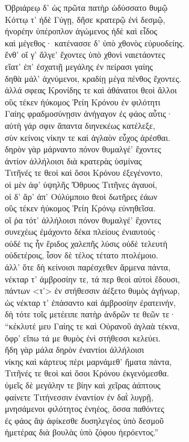 \begin{pages}
\begin{Leftside}
{\minion\Para}
Ὀβριάρεῳ δ' ὡς πρῶτα πατὴρ ὠδύσσατο θυμῷ \\
Κόττῳ τ' ἠδὲ Γύγῃ, δῆσε κρατερῷ ἐνὶ δεσμῷ, \\
ἠνορέην ὑπέροπλον ἀγώμενος ἠδὲ καὶ εἶδος\\
καὶ μέγεθος· κατένασσε δ' ὑπὸ χθονὸς εὐρυοδείης.  \\
ἔνθ' οἵ γ' ἄλγε' ἔχοντες ὑπὸ χθονὶ ναιετάοντες\\
εἵατ' ἐπ' ἐσχατιῇ μεγάλης ἐν πείρασι γαίης \\
δηθὰ μάλ' ἀχνύμενοι, κραδίῃ μέγα πένθος ἔχοντες.\\
ἀλλά σφεας Κρονίδης τε καὶ ἀθάνατοι θεοὶ ἄλλοι \\
οὓς τέκεν ἠύκομος Ῥείη Κρόνου ἐν φιλότητι  \\
Γαίης φραδμοσύνῃσιν ἀνήγαγον ἐς φάος αὖτις· \\
αὐτὴ γάρ σφιν ἅπαντα διηνεκέως κατέλεξε, \\
σὺν κείνοις νίκην τε καὶ ἀγλαὸν εὖχος ἀρέσθαι.\\
δηρὸν γὰρ μάρναντο πόνον θυμαλγέ' ἔχοντες\\
ἀντίον ἀλλήλοισι διὰ κρατερὰς ὑσμίνας   \\
Τιτῆνές τε θεοὶ καὶ ὅσοι Κρόνου ἐξεγένοντο, \\
οἱ μὲν ἀφ' ὑψηλῆς Ὄθρυος Τιτῆνες ἀγαυοί,  \\
οἱ δ' ἄρ' ἀπ' Οὐλύμποιο θεοὶ δωτῆρες ἐάων \\
οὓς τέκεν ἠύκομος Ῥείη Κρόνῳ εὐνηθεῖσα.\\
οἵ ῥα τότ' ἀλλήλοισι πόνον θυμαλγέ' ἔχοντες  \\
συνεχέως ἐμάχοντο δέκα πλείους ἐνιαυτούς· \\
οὐδέ τις ἦν ἔριδος χαλεπῆς λύσις οὐδὲ τελευτὴ\\
οὐδετέροις, ἶσον δὲ τέλος τέτατο πτολέμοιο.\\

\quad{}ἀλλ' ὅτε δὴ κείνοισι παρέσχεθεν ἄρμενα πάντα,\\
νέκταρ τ' ἀμβροσίην τε, τά περ θεοὶ αὐτοὶ ἔδουσι, \\
πάντων \textless{}τ'\textgreater{} ἐν στήθεσσιν ἀέξετο θυμὸς ἀγήνωρ,\\
ὡς νέκταρ τ' ἐπάσαντο καὶ ἀμβροσίην ἐρατεινήν,\\
δὴ τότε τοῖς μετέειπε πατὴρ ἀνδρῶν τε θεῶν τε·\\
``κέκλυτέ μευ Γαίης τε καὶ Οὐρανοῦ ἀγλαὰ τέκνα, \\
ὄφρ' εἴπω τά με θυμὸς ἐνὶ στήθεσσι κελεύει.  \\
ἤδη γὰρ μάλα δηρὸν ἐναντίοι ἀλλήλοισι\\
νίκης καὶ κάρτευς πέρι μαρνάμεθ' ἤματα πάντα, \\
Τιτῆνές τε θεοὶ καὶ ὅσοι Κρόνου ἐκγενόμεσθα.\\
ὑμεῖς δὲ μεγάλην τε βίην καὶ χεῖρας ἀάπτους\\
φαίνετε Τιτήνεσσιν ἐναντίον ἐν δαῒ λυγρῇ, \\
μνησάμενοι φιλότητος ἐνηέος, ὅσσα παθόντες\\
ἐς φάος ἂψ ἀφίκεσθε δυσηλεγέος ὑπὸ δεσμοῦ\\
ἡμετέρας διὰ βουλὰς ὑπὸ ζόφου ἠερόεντος.''\\


\end{Leftside}
\end{pages}
